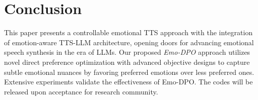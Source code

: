 \vspace{-0.2cm}
\section{Conclusion}
\vspace{-0.2cm}
This paper presents a controllable emotional TTS approach with the integration of emotion-aware TTS-LLM architecture, opening doors for advancing emotional speech synthesis in the era of LLMs. Our proposed \textit{Emo-DPO} approach utilizes novel direct preference optimization with advanced objective designs to capture subtle emotional nuances by favoring preferred emotions over less preferred ones. Extensive experiments validate the effectiveness of Emo-DPO. 
The codes will be released upon acceptance for research community.

\footnotesize
